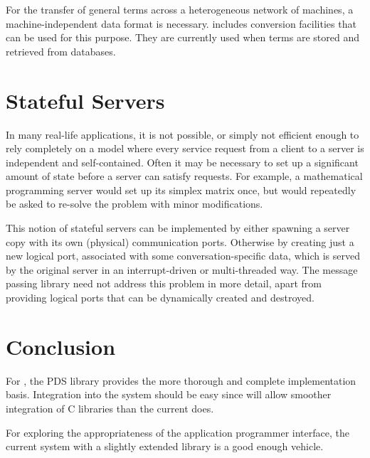 For the transfer of general \eclipse terms across a heterogeneous
network of machines, a machine-independent data format is necessary.
\eclipse includes conversion facilities that can be used for this purpose.
They are currently used when \eclipse terms are stored and retrieved from
databases.

\section{Stateful Servers}

In many real-life applications, it is not possible, or simply not
efficient enough to rely completely on a model where every service
request from a client to a server is independent and self-contained.
Often it may be necessary to set up a significant amount of state
before a server can satisfy requests. For example, a mathematical
programming server would set up its simplex matrix once, but would
repeatedly be asked to re-solve the problem with minor modifications.

This notion of stateful servers can be implemented by either spawning a server
copy with its own (physical) communication ports.
Otherwise by creating just a new logical port, associated with some
conversation-specific data, which is served
by the original server in an interrupt-driven  or multi-threaded way.
The message passing library need not address this problem in more
detail, apart from providing logical ports that can be dynamically created
and destroyed.

\section{Conclusion}

For \eclipsetwo, the PDS library \cite{kees} provides the more thorough and
complete implementation basis. Integration into the system should be easy since \eclipsetwo
will allow smoother integration of C libraries than the current \eclipse does.

For exploring the appropriateness of the application programmer interface,
the current \eclipse system with a slightly extended library \cite{vass}
is a good enough vehicle.

